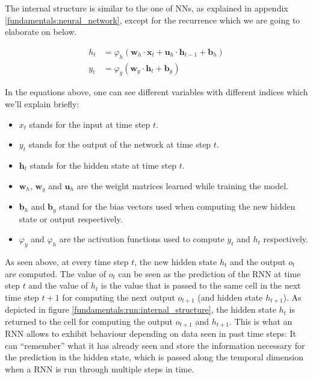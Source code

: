 The internal structure is similar to the one of NNs, as explained in appendix \ref{fundamentals:neural_network}, except for the recurrence which we are going to elaborate on below.

\begin{equation}
\begin{split}
h_t & = \varphi_h(\mathbf{w}_h \cdot \mathbf{x}_t + \mathbf{u}_h \cdot \mathbf{h}_{t-1} + \mathbf{b}_h) \\
y_t & = \varphi_y(\mathbf{w}_y \cdot \mathbf{h}_t + \mathbf{b}_y)
\end{split}
\label{fundamentals:rnn:forward_equation:hidden}
\end{equation}

In the equations above, one can see different variables with different indices which we'll explain briefly:

\begin{itemize}[noitemsep]
	\item $x_t$ stands for the input at time step $t$.
	\item $y_t$ stands for the output of the network at time step $t$.
	\item $\mathbf{h}_t$ stands for the hidden state at time step $t$.
	\item $\mathbf{w}_h$, $\mathbf{w}_y$ and $\mathbf{u}_h$ are the weight matrices learned while training the model.
	\item $\mathbf{b}_h$ and $\mathbf{b}_y$ stand for the bias vectors used when computing the new hidden state or output respectively.
	\item $\varphi_y$ and $\varphi_h$ are the activation functions used to compute $y_t$ and $h_t$ respectively.
\end{itemize}

As seen above, at every time step $t$, the new hidden state $h_t$ and the output $o_t$ are computed. The value of $o_t$ can be seen as the prediction of the RNN at time step $t$ and the value of $h_t$ is the value that is passed to the same cell in the next time step $t+1$ for computing the next output $o_{t+1}$ (and hidden state $h_{t+1}$). As depicted in figure \ref{fundamentals:rnn:internal_structure}, the hidden state $h_t$ is returned to the cell for computing the output $o_{t+1}$ and $h_{t+1}$. This is what an RNN allows to exhibit behaviour depending on data seen in past time steps: It can ``remember'' what it has already seen and store the information necessary for the prediction in the hidden state, which is passed along the temporal dimension when a RNN is run through multiple steps in time.

